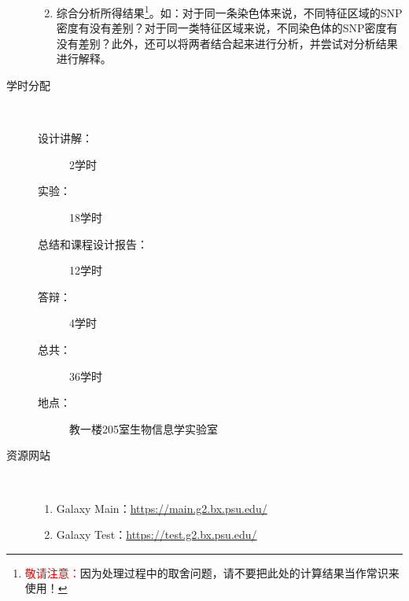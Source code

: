 \begin{description}
\begin{enumerate}
\begin{enumerate}
				\end{enumerate}
			\item 综合分析所得结果\footnote{\textcolor{red}{敬请注意：}因为处理过程中的取舍问题，请不要把此处的计算结果当作常识来使用！}。如：对于同一条染色体来说，不同特征区域的SNP密度有没有差别？对于同一类特征区域来说，不同染色体的SNP密度有没有差别？此外，还可以将两者结合起来进行分析，并尝试对分析结果进行解释。
		\end{enumerate}
	\item[学时分配] \ 
		\begin{description}
			\item[设计讲解：] 2学时
			\item[实验：] 18学时
			\item[总结和课程设计报告：] 12学时 
			\item[答辩：] 4学时
			\item[总共：] 36学时 
			\item[地点：] 教一楼205室生物信息学实验室 
		\end{description}
	\item[资源网站] \ 
		\begin{enumerate}
			\item Galaxy Main：\href{https://main.g2.bx.psu.edu/}{https://main.g2.bx.psu.edu/}
			\item Galaxy Test：\href{https://test.g2.bx.psu.edu/}{https://test.g2.bx.psu.edu/}
		\end{enumerate}
\end{description}

